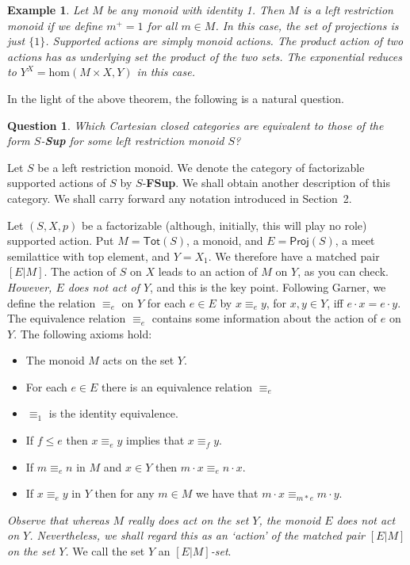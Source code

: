 \documentclass[a4paper]{amsart}
\newtheorem{example}[theorem]{Example}
\newtheorem{question}[theorem]{Question}
\begin{document}
\begin{example}{\em  Let $M$ be any monoid with identity 1.
Then $M$ is a left restriction monoid if we define $m^{+} = 1$ for all $m \in M$.
In this case, the set of projections is just $\{1\}$.
Supported actions are simply monoid actions.
The product action of two actions has as underlying set the product of the two sets.
The exponential reduces to $Y^{X} = \mbox{hom}(M \times X,Y)$ in this case.}
\end{example}


In the light of the above theorem, the following is a natural question.

\begin{question}
{\em Which Cartesian closed categories are equivalent to those of the form $S$-{\bf Sup} for some left restriction monoid $S$?}
\end{question}

Let $S$ be a left restriction monoid.
We denote the category of factorizable supported actions of $S$ by $S$-{\bf FSup}.
We shall obtain another description of this category.
We shall carry forward any notation introduced in Section~2.

Let $(S,X,p)$ be a factorizable (although, initially, this will play no role) supported action.
Put $M = \mathsf{Tot}(S)$, a monoid, and $E = \mathsf{Proj}(S)$, a meet semilattice with top element, and $Y = X_{1}$.
We therefore have a matched pair $[E|M]$.
The action of $S$ on $X$ leads to an action of $M$ on $Y$, as you can check.
{\em However, $E$ does not act of $Y$}, and this is the key point.
Following Garner, we define the relation $\equiv_{e}$ on $Y$ for each $e \in E$ by $x \equiv_{e} y$, for $x,y \in Y$, iff $e \cdot x = e \cdot y$.
The equivalence relation $\equiv_{e}$ contains some information about the action of $e$ on $Y$.
The following axioms hold:
\begin{itemize}
\item[{\rm (MPA1).}] The monoid $M$ acts on the set $Y$.
\item[{\rm (MPA2).}] For each $e \in E$ there is an equivalence relation $\equiv_{e}$
\item[{\rm (MPA3).}] $\equiv_{1}$ is the identity equivalence.
\item[{\rm (MPA4).}] If $f \leq e$ then $x \equiv_{e} y$ implies that $x \equiv_{f} y$.
\item[{\rm (MPA5).}] If $m \equiv_{e} n$ in $M$ and $x \in Y$ then $m \cdot x \equiv_{e} n \cdot x$.
\item[{\rm (MPA6).}] If $x \equiv_{e} y$ in $Y$ then for any $m \in M$ we have that $m \cdot x \equiv_{m \ast e} m \cdot y$.
\end{itemize}
{\em Observe that whereas $M$ really does act on the set $Y$, the monoid $E$ does not act on $Y$.
Nevertheless, we shall regard this as an `action' of the matched pair $[E|M]$ on the set $Y$.}
We call the set $Y$ an {\em $[E|M]$-set}.
\end{document}
